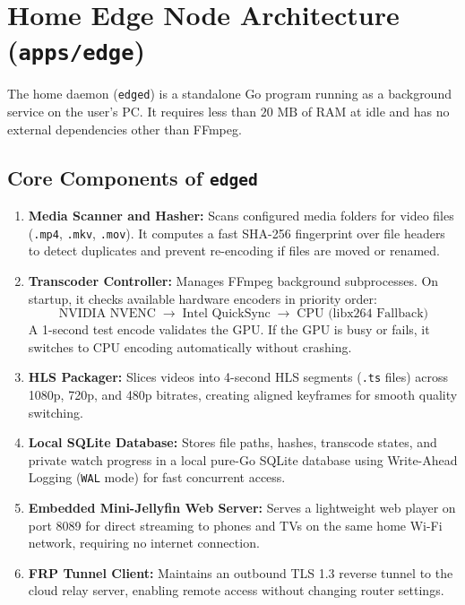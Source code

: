 \section{Home Edge Node Architecture (\texttt{apps/edge})}
\label{sec:arch_edge}

The home daemon (\texttt{edged}) is a standalone Go program running as a background service on the user's PC. It requires less than $20\text{ MB}$ of RAM at idle and has no external dependencies other than FFmpeg.

\subsection{Core Components of \texttt{edged}}
\begin{enumerate}
    \item \textbf{Media Scanner and Hasher:} Scans configured media folders for video files (\texttt{.mp4}, \texttt{.mkv}, \texttt{.mov}). It computes a fast SHA-256 fingerprint over file headers to detect duplicates and prevent re-encoding if files are moved or renamed.
    \item \textbf{Transcoder Controller:} Manages FFmpeg background subprocesses. On startup, it checks available hardware encoders in priority order:
    \begin{equation*}
        \text{NVIDIA NVENC} \;\longrightarrow\; \text{Intel QuickSync} \;\longrightarrow\; \text{CPU (libx264 Fallback)}
    \end{equation*}
    A 1-second test encode validates the GPU. If the GPU is busy or fails, it switches to CPU encoding automatically without crashing.
    \item \textbf{HLS Packager:} Slices videos into 4-second HLS segments (\texttt{.ts} files) across 1080p, 720p, and 480p bitrates, creating aligned keyframes for smooth quality switching.
    \item \textbf{Local SQLite Database:} Stores file paths, hashes, transcode states, and private watch progress in a local pure-Go SQLite database using Write-Ahead Logging (\texttt{WAL} mode) for fast concurrent access.
    \item \textbf{Embedded Mini-Jellyfin Web Server:} Serves a lightweight web player on port 8089 for direct streaming to phones and TVs on the same home Wi-Fi network, requiring no internet connection.
    \item \textbf{FRP Tunnel Client:} Maintains an outbound TLS 1.3 reverse tunnel to the cloud relay server, enabling remote access without changing router settings.
\end{enumerate}


